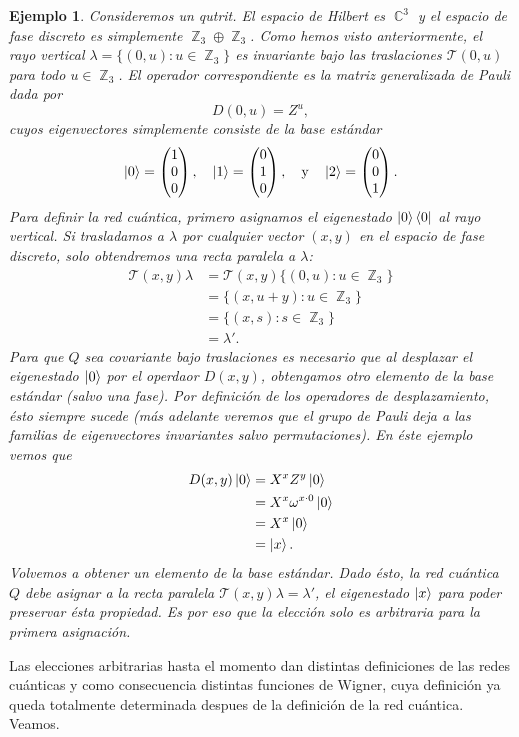 \documentclass[a4paper]{report}
\DeclareMathOperator{\C}{\mathbb{C}}
\DeclareMathOperator{\Z}{\mathbb{Z}}
\newtheorem{example}{Ejemplo}
\begin{document}
  \begin{example}
    Consideremos un qutrit. El espacio de Hilbert es
    $\C^{3}$ y el espacio de fase discreto es simplemente
    $\Z_3 \oplus \Z_3$. Como hemos visto anteriormente, el
    rayo vertical $\lambda = \{(0,u) : u \in \Z_3\}$ es
    invariante bajo las traslaciones $\mathcal T(0,u)$ para
    todo $u \in \Z_3$. El operador correspondiente es la
    matriz generalizada de Pauli dada por
    \[
      D(0,u) = Z^{u},
    \] 
    cuyos eigenvectores simplemente consiste de la base
    estándar
    \[
      \ket 0 = \begin{pmatrix} 1\\0\\0 \end{pmatrix},
      \quad
      \ket 1 = \begin{pmatrix} 0\\1\\0 \end{pmatrix},
      \quad \text{y} \quad
      \ket 2 = \begin{pmatrix} 0\\0\\1 \end{pmatrix}.
    \] 
    Para definir la red cuántica, primero asignamos el
    eigenestado $\ket 0 \bra 0$ al rayo vertical. Si
    trasladamos a $\lambda$ por \textit{cualquier} vector
    $(x,y)$ en el espacio de fase discreto, solo obtendremos
    una recta paralela a $\lambda$:
    \begin{align}
      \mathcal T(x,y) \lambda
      &= \mathcal T(x,y) \{(0,u) : u \in \Z_3\} \\
      &= \{(x,u+y) : u \in \Z_3\} \\
      &= \{(x,s) : s \in \Z_3\} \\
      &= \lambda'.
    \end{align}
    Para que $Q$ sea covariante bajo traslaciones es
    necesario que al desplazar el eigenestado $\ket 0$ por
    el operdaor $D(x,y)$, obtengamos otro elemento de la
    base estándar (salvo una fase). Por definición de los
    operadores de desplazamiento, ésto siempre sucede (más
    adelante veremos que el grupo de Pauli deja a las
    familias de eigenvectores invariantes salvo
    permutaciones). En éste ejemplo vemos que
    \begin{align}
      D(x,y) \ket 0
      &= X^{x} Z^{y} \ket 0 \\
      &= X^{x} \omega^{x \cdot 0} \ket 0 \\
      &= X^{x} \ket 0 \\
      &= \ket x.
    \end{align}
    Volvemos a obtener un elemento de la base estándar. Dado
    ésto, la red cuántica $Q$ debe asignar a la recta
    paralela $\mathcal T(x,y) \lambda = \lambda'$, el
    eigenestado $\ket x$ para poder preservar ésta
    propiedad. Es por eso que la elección solo es arbitraria
    para la primera asignación.
  \end{example}
  Las elecciones arbitrarias hasta el momento
  dan distintas definiciones de las redes cuánticas y como
  consecuencia distintas funciones de Wigner, cuya
  definición ya queda totalmente determinada despues de la
  definición de la red cuántica. Veamos.
\end{document}
